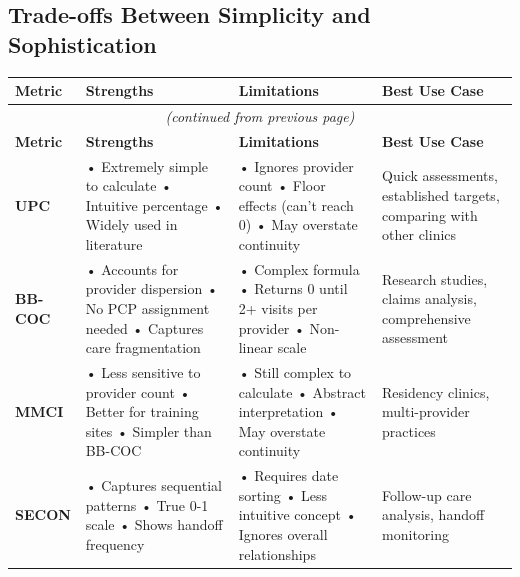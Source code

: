 \documentclass[11pt,a4paper]{article}
\begin{document}
\subsection{Trade-offs Between Simplicity and Sophistication}

\begin{longtable}{p{2cm}p{5cm}p{5cm}p{4cm}}
\toprule
\textbf{Metric} & \textbf{Strengths} & \textbf{Limitations} & \textbf{Best Use Case} \\
\midrule
\endfirsthead
\multicolumn{4}{c}{\textit{(continued from previous page)}} \\
\toprule
\textbf{Metric} & \textbf{Strengths} & \textbf{Limitations} & \textbf{Best Use Case} \\
\midrule
\endhead
\bottomrule
\endfoot
\bottomrule
\endlastfoot

\textbf{UPC} & 
• Extremely simple to calculate\newline
• Intuitive percentage\newline
• Widely used in literature & 
• Ignores provider count\newline
• Floor effects (can't reach 0)\newline
• May overstate continuity & 
Quick assessments, established targets, comparing with other clinics \\

\textbf{BB-COC} & 
• Accounts for provider dispersion\newline
• No PCP assignment needed\newline
• Captures care fragmentation & 
• Complex formula\newline
• Returns 0 until 2+ visits per provider\newline
• Non-linear scale & 
Research studies, claims analysis, comprehensive assessment \\

\textbf{MMCI} & 
• Less sensitive to provider count\newline
• Better for training sites\newline
• Simpler than BB-COC & 
• Still complex to calculate\newline
• Abstract interpretation\newline
• May overstate continuity & 
Residency clinics, multi-provider practices \\

\textbf{SECON} & 
• Captures sequential patterns\newline
• True 0-1 scale\newline
• Shows handoff frequency & 
• Requires date sorting\newline
• Less intuitive concept\newline
• Ignores overall relationships & 
Follow-up care analysis, handoff monitoring \\


\end{longtable}
\end{document}
